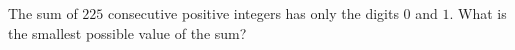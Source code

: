 The sum of $225$ consecutive positive integers has only the digits $0$ and $1$. What is the smallest possible value of the sum?
